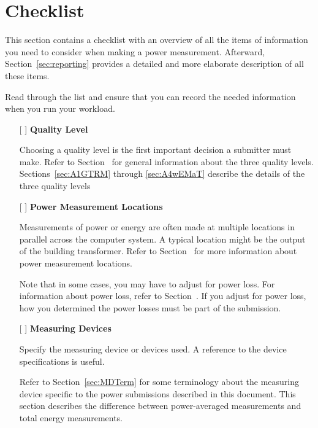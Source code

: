 \chapter{Checklist}
\label{sec:checklist}

\noindent
This section contains a checklist with an overview of all the items of information you need to consider when making a power measurement.
Afterward, Section~\ref{sec:reporting} provides a detailed and more elaborate description of all these items.
\wl

\noindent
Read through the list and ensure that you can record the needed 
information when you run your workload.
\wl

\begin{itemize}
\item[{[ ]}]
\textbf{Quality Level}

Choosing a quality level is the first important decision a submitter must make. Refer to 
Section~ for general information about the three quality levels.  
Sections~\ref{sec:A1GTRM} through \ref{sec:A4wEMaT} describe the details of the three quality levels

\item[{[ ]}]
\textbf{Power Measurement Locations}

Measurements of power or energy are often made at multiple locations in parallel across the computer system. A typical location might be the output of the building transformer.
Refer to Section~ for more information about power measurement locations.

Note that in some cases, you may have to adjust for power loss. For information about power loss, refer to Section~.
If you adjust for power loss, how you determined the power losses must be part of the submission.


\newpage

\item[{[ ]}]
\textbf{Measuring Devices}

Specify the measuring device or devices used. A reference to the device specifications is useful.

Refer to Section~\ref{sec:MDTerm} for some terminology about the measuring device specific to the power submissions described in this document. This section describes the difference between power-averaged measurements and total energy measurements.


\end{itemize}
